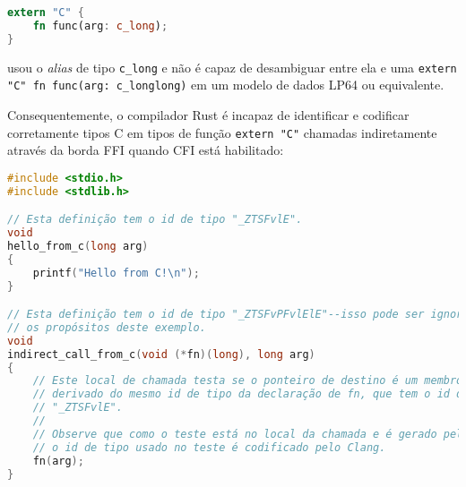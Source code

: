 \documentclass{article}
\begin{document}
\begin{lstlisting}[language=Rust, caption={Exemplo de função extern "C"\ usando um alias de tipo C.}]
extern "C" {
    fn func(arg: c_long);
}
\end{lstlisting}

usou o \textit{alias} de tipo \texttt{c\_long} e não é capaz de desambiguar entre ela e uma \texttt{extern "C"\ fn func(arg: c\_longlong)} em um modelo de dados LP64 ou equivalente.

Consequentemente, o compilador Rust é incapaz de identificar e codificar corretamente tipos C em tipos de função \texttt{extern "C"} chamadas indiretamente através da borda FFI quando CFI está habilitado:

\begin{lstlisting}[language=C, caption={Exemplo de biblioteca C usando tipos inteiros C e codificação do Clang.}]
#include <stdio.h>
#include <stdlib.h>

// Esta definição tem o id de tipo "_ZTSFvlE".
void
hello_from_c(long arg)
{
    printf("Hello from C!\n");
}

// Esta definição tem o id de tipo "_ZTSFvPFvlElE"--isso pode ser ignorado para
// os propósitos deste exemplo.
void
indirect_call_from_c(void (*fn)(long), long arg)
{
    // Este local de chamada testa se o ponteiro de destino é um membro do grupo
    // derivado do mesmo id de tipo da declaração de fn, que tem o id de tipo
    // "_ZTSFvlE".
    //
    // Observe que como o teste está no local da chamada e é gerado pelo Clang,
    // o id de tipo usado no teste é codificado pelo Clang.
    fn(arg);
}
\end{lstlisting}
\end{document}

